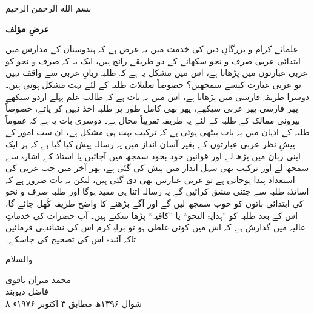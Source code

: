 \gdef\currentbab{عرض مؤلف}
\pstart\centering بسم الله الرحمن الرحيم\par\pend
\pstart\centering\large\bfseries\urdufont عرضِ مؤلف\par\pend
\begin{urduprose}
\pstart\fontsize{9.4}{18.2}\selectfont
علمائے كرام و بزرگانِ دين كى خدمت ميں يہ عرض ہے كہ ہندوستان كے مدارس ميں ابتدائى عربى صرف و نحو سكھانے كے دو طريقے رائج ہيں، ايک يہ كہ صرف و نحو كو عربى عبارتوں ميں پڑھانا ہے، اس ميں مشكل يہ ہے كہ طلبہ زبانِ عربى سے واقف نہيں تو عربى عبارت كيسے سمجھيں؟ خصوصاً تعليلات طلبہ كے لئے بہت مشكل ہوتى ہيں۔ دوسرا طريقہ فارسى ميں پڑھانا ہے، اس ميں يہ بات ہے كہ طالب علم پہلے اردو سيكھے پھر فارسى پھر عربى سيكھے، پھر بھى كامل طور پر طلبہ اخذ نہيں كر پاتے، خصوصاً بيرونى ممالک كے طلبہ كے لئے يہ طريقہ تقريباً محال ہے۔
\pend
\pstart\fontsize{9.4}{18.2}\selectfont
دوسرى بات يہ ہے كہ عموماً طلبہ كے اذہان ميں يہ بات بيٹھى ہوئى ہے كہ تركيب بہت ہى مشكل ہے، ان سب امور كے پيشِ نظر عربى عبارتوں كے بغير آسان انداز ميں يہ رسالہ پيش كيا گيا ہے كہ ہر ايک اپنى زبان ميں پڑھ لے اور قوانين خود بخود سمجھ ميں آجائيں يا استاذ كے اشارہ سے سمجھ لے اور تركيب بھى سہل انداز ميں پيش كى گئى ہے، پھر آخر ميں جب عربى كى استعداد پيدا ہوجاتى ہے تو عربى عبارتيں بھى دى گئى ہيں، ليكن يہ بات ضرور ہے كہ اساتذہ طلبہ سے جتنى مشق كرائيں گے يہ رسالہ اتنا ہى مفيد ہوگا اور طلبہ صرف و نحو كى ابتدائى باتوں كو خوب سمجھ ليں گے اور آگے بڑھنے كا واضح طريقہ كُھل جائے گا، اس كے بعد طلبہ كو ”ہدايۃ النحو“ يا ”كافيہ“ پڑھا سكتے ہيں۔ آپ حضرات كى خدماتِ عاليہ ميں گذارش ہے كہ اس ميں كوئى غلطى ہو تو براہِ كرم اس كى نشاندہى فرمائيں تاكہ آئندہ اس كى تصحيح كى جاسكے۔
\pend
\pstart
\begin{minipage}[t]{.45\linewidth}والسلام\end{minipage}\hfill
\begin{minipage}[t]{.45\linewidth}\raggedleft\setlength{\baselineskip}{1.8em}
محمد ميران باقوى\\ فاضل ديوبند\\
۸ شوال ۱۳۹۶ھ مطابق ۳ اكتوبر ۱۹۷۶ء\end{minipage}
\pend
\end{urduprose}
